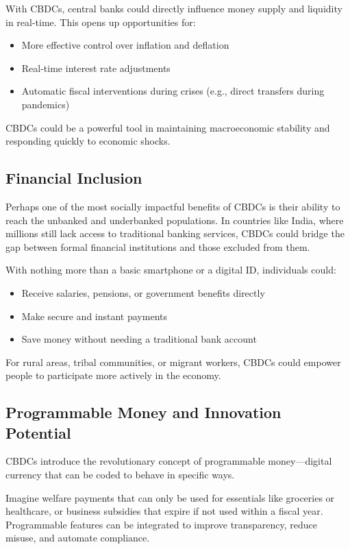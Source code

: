 With CBDCs, central banks could directly influence money supply and liquidity in real-time. This opens up opportunities for:

\begin{itemize}
    \item More effective control over inflation and deflation
    \item Real-time interest rate adjustments
    \item Automatic fiscal interventions during crises (e.g., direct transfers during pandemics)
\end{itemize}

CBDCs could be a powerful tool in maintaining macroeconomic stability and responding quickly to economic shocks.

\subsection{Financial Inclusion}
Perhaps one of the most socially impactful benefits of CBDCs is their ability to reach the unbanked and underbanked populations. In countries like India, where millions still lack access to traditional banking services, CBDCs could bridge the gap between formal financial institutions and those excluded from them.

With nothing more than a basic smartphone or a digital ID, individuals could:

\begin{itemize}
    \item Receive salaries, pensions, or government benefits directly
    \item Make secure and instant payments
    \item Save money without needing a traditional bank account
\end{itemize}

For rural areas, tribal communities, or migrant workers, CBDCs could empower people to participate more actively in the economy.

\subsection{Programmable Money and Innovation Potential}
CBDCs introduce the revolutionary concept of programmable money—digital currency that can be coded to behave in specific ways.

Imagine welfare payments that can only be used for essentials like groceries or healthcare, or business subsidies that expire if not used within a fiscal year. Programmable features can be integrated to improve transparency, reduce misuse, and automate compliance.

